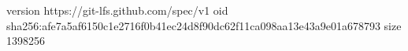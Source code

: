 version https://git-lfs.github.com/spec/v1
oid sha256:afe7a5af6150c1e2716f0b41ec24d8f90dc62f11ca098aa13e43a9e01a678793
size 1398256
